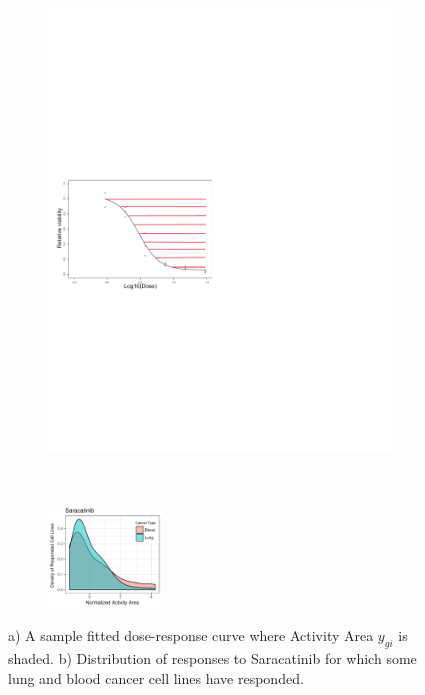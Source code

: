 \begin{figure}
	\centering
	\begin{subfigure}[b]{0.22\textwidth}
		\includegraphics[width=\textwidth]{./img/dr4.pdf}
		\caption{}\label{fig:dr}
	\end{subfigure} ~
	\begin{subfigure}[b]{0.22\textwidth}
		\includegraphics[height=2.7cm]{./img/Saracatinib.pdf}
		\caption{}\label{fig:Saracatinib}
	\end{subfigure}
	\squeezeup
	\caption{a) A sample fitted dose-response curve where Activity Area $y_{gi}$ is shaded. b) Distribution of responses to Saracatinib for which some lung and blood cancer cell lines have responded.}
	\label{fig syn3}
\end{figure}
\vspace{-5mm}
